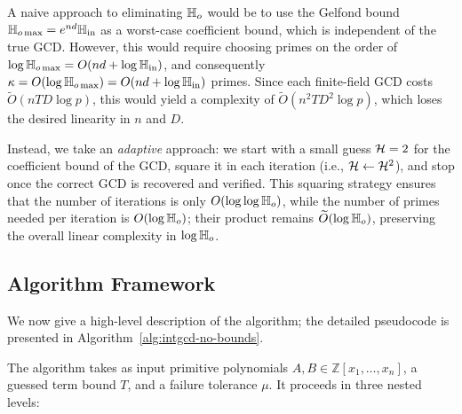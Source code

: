 \documentclass{article}
\numberwithin{equation}{section}
\begin{document}
A naive approach to eliminating $\mathbb{H}_{o}$ would be to use the Gelfond bound $\mathbb{H}_{o\max} = e^{nd} \mathbb{H}_{\rm in}$ as a worst-case coefficient bound, which is independent of the true GCD. However, this would require choosing primes on the order of $\log \mathbb{H}_{o\max} = O(nd + \log \mathbb{H}_{\rm in})$, and consequently $\kappa = O(\log \mathbb{H}_{o\max}) = O(nd + \log \mathbb{H}_{\rm in})$ primes. Since each finite-field GCD costs $\tilde{O}(nTD\log p)$, this would yield a complexity of $\tilde{O}(n^2 T D^2\log p)$, which loses the desired linearity in $n$ and $D$. 

Instead, we take an \emph{adaptive} approach: we start with a small guess ${\mathcal{H}} = 2$ for the coefficient bound of the GCD, square it in each iteration (i.e., ${\mathcal{H}} \gets {\mathcal{H}}^2$), and stop once the correct GCD is recovered and verified. This squaring strategy ensures that the number of iterations is only $O(\log\log \mathbb{H}_{o})$, while the number of primes needed per iteration is $O(\log \mathbb{H}_{o})$; their product remains $\widetilde{O}(\log \mathbb{H}_{o})$, preserving the overall linear complexity in $\log \mathbb{H}_{o}$. 



\subsection*{Algorithm Framework}

We now give a high-level description of the algorithm; the detailed pseudocode is presented in Algorithm~\ref{alg:intgcd-no-bounds}.

The algorithm takes as input primitive polynomials $A, B \in \mathbb{Z}[x_1,\dots,x_n]$, a guessed term bound $T$, and a failure tolerance $\mu$. It proceeds in three nested levels:
\end{document}
